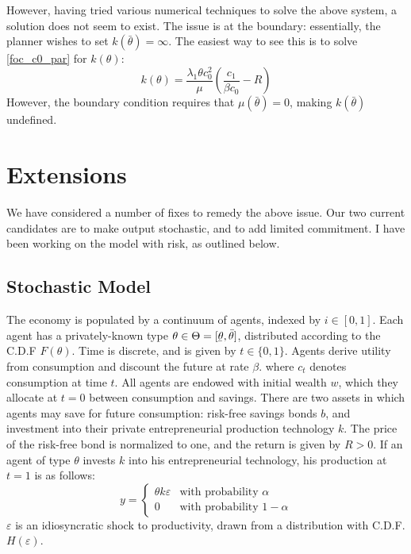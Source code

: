 \documentclass[11pt]{article}
\newcommand{\ubar}[1]{\underaccent{\bar}{#1}}
\begin{document}
However, having tried various numerical techniques to solve the above system, a solution does not seem to exist. The issue is at the boundary: essentially, the planner wishes to set \( k(\bar{\theta}) = \infty \). The easiest way to see this is to solve \ref{foc_c0_par} for \( k(\theta) \):
\begin{equation}
    k(\theta) = \frac{\lambda_1\theta c_0^2}{\mu}\left( \frac{c_1}{\beta c_0} - R \right)
\end{equation}
However, the boundary condition requires that \( \mu(\bar{\theta}) = 0 \), making \( k(\bar{\theta}) \) undefined. 

\section{Extensions}
We have considered a number of fixes to remedy the above issue. Our two current candidates are to make output stochastic, and to add limited commitment. I have been working on the model with risk, as outlined below.

\subsection{Stochastic Model}

The economy is populated by a continuum of agents, indexed by \( i\in[0,1] \). Each agent has a privately-known type \( \theta\in\Theta=[\ubar{\theta},\bar{\theta}] \), distributed according to the C.D.F \( F(\theta) \). Time is discrete, and is given by \( t\in\{0,1\} \). Agents derive utility from consumption and discount the future at rate \( \beta \).
where \( c_t \) denotes consumption at time \( t \). All agents are endowed with initial wealth \( w \), which they allocate at \( t = 0 \) between consumption and savings. There are two assets in which agents may save for future consumption: risk-free savings bonds \( b \), and investment into their private entrepreneurial production technology \( k \). The price of the risk-free bond is normalized to one, and the return is given by \( R > 0 \). If an agent of type \( \theta \) invests \( k \) into his entrepreneurial technology, his production at \( t = 1 \) is as follows:
\begin{equation}
    y = \begin{cases}
        \theta k \varepsilon & \text{with probability }\alpha \\
        0 & \text{with probability }1 - \alpha
    \end{cases}
\end{equation}
\( \varepsilon \) is an idiosyncratic shock to productivity, drawn from a distribution with C.D.F. \( H(\varepsilon) \). 
\end{document}
